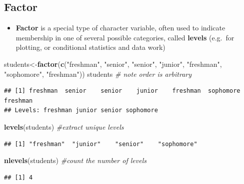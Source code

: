 \documentclass[]{book}
\newenvironment{Shaded}{\begin{snugshade}}{\end{snugshade}}
\newcommand{\KeywordTok}[1]{\textcolor[rgb]{0.13,0.29,0.53}{\textbf{#1}}}
\newcommand{\StringTok}[1]{\textcolor[rgb]{0.31,0.60,0.02}{#1}}
\newcommand{\CommentTok}[1]{\textcolor[rgb]{0.56,0.35,0.01}{\textit{#1}}}
\newcommand{\NormalTok}[1]{#1}
\providecommand{\tightlist}{%
  \setlength{\itemsep}{0pt}\setlength{\parskip}{0pt}}
\theoremstyle{definition}
\theoremstyle{definition}
\theoremstyle{definition}
\theoremstyle{remark}
\begin{document}
\subsection{Factor}\label{factor}

\begin{itemize}
\tightlist
\item
  \textbf{Factor} is a special type of character variable, often used to
  indicate membership in one of several possible categories, called
  \textbf{levels} (e.g.~for plotting, or conditional statistics and data
  work)
\end{itemize}

\begin{Shaded}
\begin{Highlighting}[]
\NormalTok{students<-}\KeywordTok{factor}\NormalTok{(}\KeywordTok{c}\NormalTok{(}\StringTok{"freshman"}\NormalTok{, }\StringTok{"senior"}\NormalTok{, }\StringTok{"senior"}\NormalTok{, }\StringTok{"junior"}\NormalTok{, }\StringTok{"freshman"}\NormalTok{, }
                   \StringTok{"sophomore"}\NormalTok{, }\StringTok{"freshman"}\NormalTok{))}
\NormalTok{students }\CommentTok{# note order is arbitrary}
\end{Highlighting}
\end{Shaded}

\begin{verbatim}
## [1] freshman  senior    senior    junior    freshman  sophomore freshman 
## Levels: freshman junior senior sophomore
\end{verbatim}

\begin{Shaded}
\begin{Highlighting}[]
\KeywordTok{levels}\NormalTok{(students) }\CommentTok{#extract unique levels }
\end{Highlighting}
\end{Shaded}

\begin{verbatim}
## [1] "freshman"  "junior"    "senior"    "sophomore"
\end{verbatim}

\begin{Shaded}
\begin{Highlighting}[]
\KeywordTok{nlevels}\NormalTok{(students) }\CommentTok{#count the number of levels }
\end{Highlighting}
\end{Shaded}

\begin{verbatim}
## [1] 4
\end{verbatim}
\end{document}
